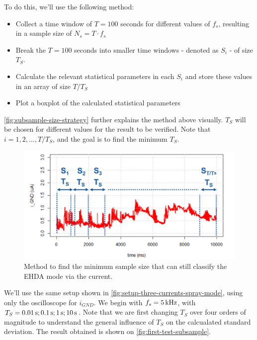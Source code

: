 \documentclass[oneside,12pt]{article}
\begin{document}
To do this, we'll use the following method:

\begin{itemize}
    \item Collect a time window of $T = 100$ seconds for different values of $f_s$, resulting in a sample size of $N_s = T \cdot f_s$
    \item Break the $T = 100$ seconds into smaller time windows - denoted as $S_i$ - of size $T_S$. 
    \item Calculate the relevant statistical parameters in each $S_i$ and store these values in an array of size $T / T_S$
    \item Plot a boxplot of the calculated statistical parameters
\end{itemize}

\autoref{fig:subsample-size-strategy} further explains the method above visually. $T_S$ will be chosen for different values for the result to be verified. 
Note that $i = 1, 2, ..., T / T_S$, and the goal is to find the minimum $T_S$.

\begin{figure}[h!]
    \centering
    \includegraphics[width=.8\textwidth,trim=1 1 1 1,clip]{figures/subsample-size-strategy.png}
    \caption{Method to find the minimum sample size that can still classify the EHDA mode via the current.}
    \label{fig:subsample-size-strategy}
\end{figure}

We'll use the same setup shown in \autoref{fig:setup-three-currents-spray-mode}, using only the oscilloscope for $i_{GND}$.
We begin with $f_s = 5 \,\mathrm{kHz}$, with $T_S = 0.01 \,\mathrm{s}; 0.1 \,\mathrm{s}; 1 \,\mathrm{s}; 10 \,\mathrm{s}$. Note that we are first changing
$T_S$ over four orders of magnitude to understand the general influence of $T_S$ on the calcualated standard deviation.
The result obtained is shown on \autoref{fig:first-test-subsample}.
\end{document}

